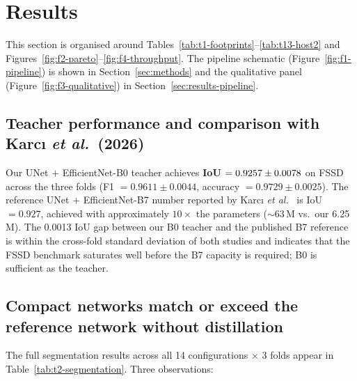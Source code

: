 
\section{Results}
\label{sec:results}

This section is organised around Tables~\ref{tab:t1-footprints}--\ref{tab:t13-host2} and Figures~\ref{fig:f2-pareto}--\ref{fig:f4-throughput}. The pipeline schematic (Figure~\ref{fig:f1-pipeline}) is shown in Section~\ref{sec:methods} and the qualitative panel (Figure~\ref{fig:f3-qualitative}) in Section~\ref{sec:results-pipeline}.

\subsection{Teacher performance and comparison with Karc{\i} \emph{et al.}~(2026)}
\label{sec:results-teacher}

Our UNet $+$ EfficientNet-B0 teacher achieves \textbf{IoU $= 0.9257 \pm 0.0078$} on FSSD across the three folds (F1 $= 0.9611 \pm 0.0044$, accuracy $= 0.9729 \pm 0.0025$). The reference UNet $+$ EfficientNet-B7 number reported by Karc{\i} \emph{et al.}~\cite{karci2026deep} is IoU $= 0.927$, achieved with approximately $10\times$ the parameters ($\sim 63$\,M vs.~our 6.25\,M). The 0.0013 IoU gap between our B0 teacher and the published B7 reference is within the cross-fold standard deviation of both studies and indicates that the FSSD benchmark saturates well before the B7 capacity is required; B0 is sufficient as the teacher.

\subsection{Compact networks match or exceed the reference network without distillation}
\label{sec:results-kd}

The full segmentation results across all 14 configurations $\times$ 3 folds appear in Table~\ref{tab:t2-segmentation}. Three observations:



